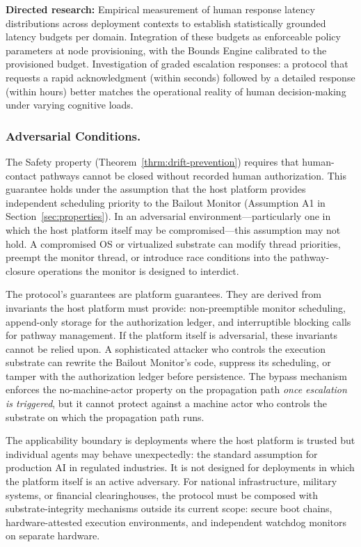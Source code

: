 \textbf{Directed research:} Empirical measurement of human response latency distributions across deployment contexts to establish statistically grounded latency budgets per domain. Integration of these budgets as enforceable policy parameters at node provisioning, with the Bounds Engine calibrated to the provisioned budget. Investigation of graded escalation responses: a protocol that requests a rapid acknowledgment (within seconds) followed by a detailed response (within hours) better matches the operational reality of human decision-making under varying cognitive loads.

\subsubsection{Adversarial Conditions.}
\label{sec:limitations-adversarial}

The Safety property (Theorem~\ref{thrm:drift-prevention}) requires that human-contact pathways cannot be closed without recorded human authorization. This guarantee holds under the assumption that the host platform provides independent scheduling priority to the Bailout Monitor (Assumption A1 in Section~\ref{sec:properties}). In an adversarial environment---particularly one in which the host platform itself may be compromised---this assumption may not hold. A compromised OS or virtualized substrate can modify thread priorities, preempt the monitor thread, or introduce race conditions into the pathway-closure operations the monitor is designed to interdict.

The protocol's guarantees are platform guarantees. They are derived from invariants the host platform must provide: non-preemptible monitor scheduling, append-only storage for the authorization ledger, and interruptible blocking calls for pathway management. If the platform itself is adversarial, these invariants cannot be relied upon. A sophisticated attacker who controls the execution substrate can rewrite the Bailout Monitor's code, suppress its scheduling, or tamper with the authorization ledger before persistence. The bypass mechanism enforces the no-machine-actor property on the propagation path \emph{once escalation is triggered}, but it cannot protect against a machine actor who controls the substrate on which the propagation path runs.

The applicability boundary is deployments where the host platform is trusted but individual agents may behave unexpectedly: the standard assumption for production AI in regulated industries. It is not designed for deployments in which the platform itself is an active adversary. For national infrastructure, military systems, or financial clearinghouses, the protocol must be composed with substrate-integrity mechanisms outside its current scope: secure boot chains, hardware-attested execution environments, and independent watchdog monitors on separate hardware.

